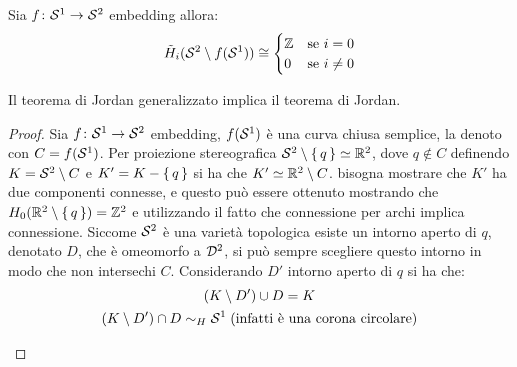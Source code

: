 \begin{example}
  Sia $ f \colon \mathcal{S}^{1} \to \mathcal{S}^{2} $ embedding allora:
  \[
    \tilde{H}_i(\mathcal{S}^{2} \setminus f(\mathcal{S}^{1})) \cong
    \begin{cases}
      \mathbb{Z} & \text{se } i = 0 \\
      0 & \text{se } i \not = 0
    \end{cases}
  \]
\end{example}

\begin{proposition}
  Il teorema di Jordan generalizzato implica il teorema di Jordan.
\end{proposition}
\begin{proof}
  Sia $ f \colon \mathcal{S}^{1} \to \mathcal{S}^{2} $ embedding, $ f(\mathcal{S}^{1}) $ è una curva chiusa
  semplice, la denoto con $ C = f(\mathcal{S}^{1})$. Per proiezione stereografica
  $ \mathcal{S}^{2} \setminus \set{q} \simeq \mathbb{R}^{2} $, dove $ q \not \in C $ definendo
  $ K = \mathcal{S}^{2} \setminus C $ e $ K' = K - \set{q} $ si ha che
  $ K' \simeq \mathbb{R}^{2} \setminus C $. bisogna mostrare che $ K' $ ha due componenti connesse, e
  questo può essere ottenuto mostrando che
  $ H_0(\mathbb{R}^{2} \setminus \set{q}) = \mathbb{Z}^2 $ e utilizzando il fatto che connessione per
  archi implica connessione.
  Siccome $ \mathcal{S}^{2} $ è una varietà topologica esiste un intorno aperto di $ q $,
  denotato $ D $, che è omeomorfo a $ \mathcal{D}^{2} $, si può sempre scegliere
  questo intorno in modo che non intersechi $ C $. Considerando $ D' $
  intorno aperto di $ q $ si ha che:
  \begin{gather*}
    (K \setminus D') \cup D = K \\
    (K \setminus D') \cap D \sim_H \mathcal{S}^{1} \; (\text{infatti è una corona circolare})
  \end{gather*}
  \begin{figure}[htbp]
    \centering
\end{figure}
\end{proof}

